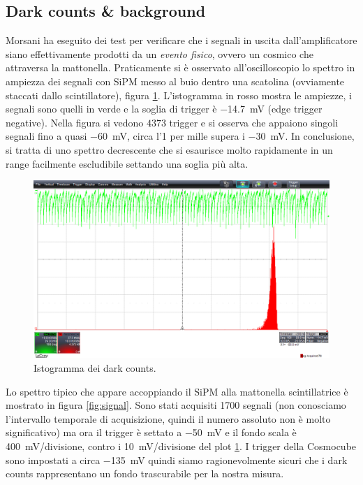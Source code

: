 \documentclass[11pt,a4paper]{article}
\begin{document}
\subsection{Dark counts \& background}
Morsani ha eseguito dei test per verificare che i segnali in uscita dall'amplificatore siano effettivamente prodotti da un \textit{evento fisico}, ovvero un cosmico che attraversa la mattonella. Praticamente si è osservato all'oscilloscopio lo spettro in ampiezza dei segnali
con SiPM messo al buio dentro una scatolina (ovviamente staccati dallo scintillatore), figura \ref{fig:dark}. L'istogramma in rosso mostra le ampiezze, i segnali sono quelli in verde %
e la soglia di trigger è \SI{-14.7}{mV} (edge trigger negative). Nella figura si vedono $4373$ trigger e si osserva che appaiono singoli segnali fino a quasi \SI{-60}{mV}, circa l'1 per mille supera i \SI{-30}{mV}. In conclusione, si tratta di uno spettro decrescente che si esaurisce molto rapidamente in un range facilmente escludibile settando una soglia più alta.

\begin{figure}
    \centering
    \includegraphics[scale=0.3]{Immagini/dark_counts.png}
    \caption{Istogramma dei dark counts.}
    \label{fig:dark}
\end{figure}

Lo spettro tipico che appare accoppiando il SiPM alla mattonella scintillatrice è mostrato in figura \ref{fig:signal}. Sono stati acquisiti 1700 segnali (non conosciamo l'intervallo temporale di acquisizione, quindi il numero assoluto non è molto significativo) ma ora il trigger è settato a \SI{-50}{mV} e il fondo scala è \SI{400}{mV/divisione}, contro i \SI{10}{mV/divisione} del plot \ref{fig:dark}. I trigger della Cosmocube sono impostati a circa \SI{-135}{mV} quindi siamo ragionevolmente sicuri che i dark counts rappresentano un fondo trascurabile per la nostra misura.
\end{document}
